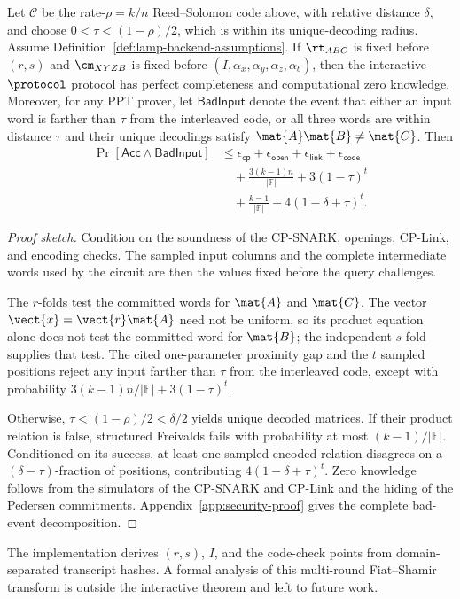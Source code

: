 \begin{theorem}
\label{thm:security}
Let \(\mathcal{C}\) be the rate-\(\rho=k/n\) Reed--Solomon code above, with
relative distance \(\delta\), and choose
\(0<\tau<(1-\rho)/2\), which is within its unique-decoding radius.  Assume
Definition~\ref{def:lamp-backend-assumptions}.  If \(\rt_{ABC}\) is fixed
before \((r,s)\) and \(\cm_{XYZB}\) is fixed before
\((I,\alpha_x,\alpha_y,\alpha_z,\alpha_b)\), then the interactive
\(\protocol\) protocol has perfect completeness and computational zero
knowledge.  Moreover, for any PPT prover, let \(\mathsf{BadInput}\) denote
the event that either an input word is farther than \(\tau\) from the
interleaved code, or all three words are within distance \(\tau\) and their
unique decodings satisfy \(\mat{A}\mat{B}\ne\mat{C}\).  Then
\[
\begin{aligned}
\Pr[\mathsf{Acc}\land\mathsf{BadInput}]
&\le \epsilon_{\mathsf{cp}}+\epsilon_{\mathsf{open}}
   +\epsilon_{\mathsf{link}}+\epsilon_{\mathsf{code}}\\
&\quad +\frac{3(k-1)n}{|\mathbb F|}
   +3(1-\tau)^t\\
&\quad +\frac{k-1}{|\mathbb{F}|}
   +4(1-\delta+\tau)^t .
\end{aligned}
\]
\end{theorem}

\begin{proof}[Proof sketch]
Condition on the soundness of the CP-SNARK, openings, CP-Link, and encoding
checks.  The sampled input columns and the complete intermediate words used by
the circuit are then the values fixed before the query challenges.

The \(r\)-folds test the committed words for \(\mat{A}\) and \(\mat{C}\).
The vector \(\vect{x}=\vect{r}\mat{A}\) need not be uniform, so its product
equation alone does not test the committed word for \(\mat{B}\); the independent
\(s\)-fold supplies that test.  The cited one-parameter proximity gap and the
\(t\) sampled positions reject any input farther than \(\tau\) from the
interleaved code, except with probability
\(3(k-1)n/|\mathbb F|+3(1-\tau)^t\).

Otherwise, \(\tau<(1-\rho)/2<\delta/2\) yields unique decoded matrices.  If their product
relation is false, structured Freivalds fails with probability at most
\((k-1)/|\mathbb F|\).  Conditioned on its success, at least one sampled
encoded relation disagrees on a \((\delta-\tau)\)-fraction of positions,
contributing \(4(1-\delta+\tau)^t\).  Zero knowledge follows from the
simulators of the CP-SNARK and CP-Link and the hiding of the Pedersen
commitments.  Appendix~\ref{app:security-proof} gives the complete
bad-event decomposition.
\end{proof}

\begin{remark}
The implementation derives \((r,s)\), \(I\), and the code-check points from
domain-separated transcript hashes.  A formal analysis of this multi-round
Fiat--Shamir transform is outside the interactive theorem and left to future
work.
\end{remark}
